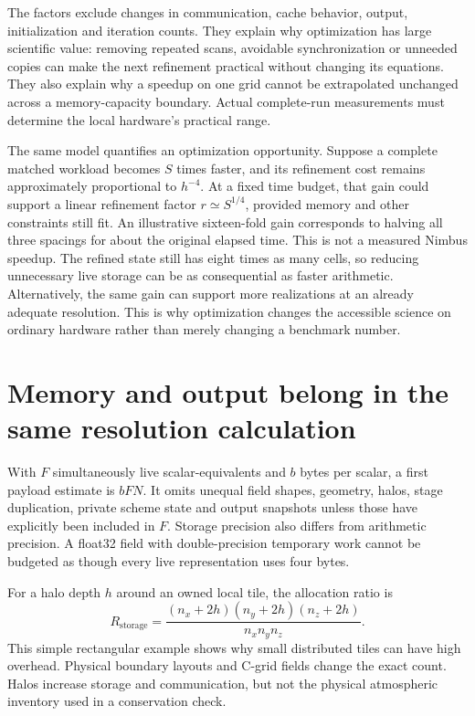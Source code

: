 The factors exclude changes in communication, cache behavior, output,
initialization and iteration counts. They explain why optimization has large
scientific value: removing repeated scans, avoidable synchronization or
unneeded copies can make the next refinement practical without changing its
equations. They also explain why a speedup on one grid cannot be extrapolated
unchanged across a memory-capacity boundary. Actual complete-run measurements
must determine the local hardware's practical range.

The same model quantifies an optimization opportunity. Suppose a complete
matched workload becomes $S$ times faster, and its refinement cost remains
approximately proportional to $h^{-4}$. At a fixed time budget, that gain could
support a linear refinement factor $r\simeq S^{1/4}$, provided memory and other
constraints still fit. An illustrative sixteen-fold gain corresponds to
halving all three spacings for about the original elapsed time. This is not
a measured Nimbus speedup. The refined state still has eight times as many
cells, so reducing unnecessary live storage can be as consequential as faster
arithmetic. Alternatively, the same gain can support more realizations at an
already adequate resolution. This is why optimization changes the accessible
science on ordinary hardware rather than merely changing a benchmark number.

\section{Memory and output belong in the same resolution calculation}

With $F$ simultaneously live scalar-equivalents and $b$ bytes per scalar, a
first payload estimate is $bFN$. It omits unequal field shapes, geometry,
halos, stage duplication, private scheme state and output snapshots unless
those have explicitly been included in $F$. Storage precision also differs
from arithmetic precision. A float32 field with double-precision temporary
work cannot be budgeted as though every live representation uses four bytes.

For a halo depth $h$ around an owned local tile, the allocation ratio is
\[
 R_{\mathrm{storage}}=
 \frac{(n_x+2h)(n_y+2h)(n_z+2h)}{n_xn_yn_z}.
\]
This simple rectangular example shows why small distributed tiles can have
high overhead. Physical boundary layouts and C-grid fields change the exact
count. Halos increase storage and communication, but not the physical
atmospheric inventory used in a conservation check.

